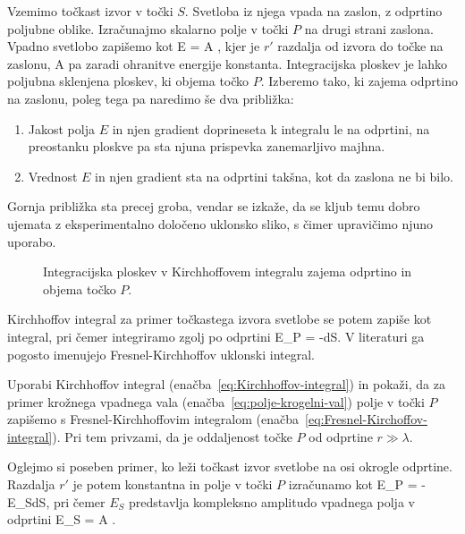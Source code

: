 Vzemimo točkast izvor v točki $S$. Svetloba iz njega vpada na zaslon, 
z odprtino poljubne oblike. Izračunajmo skalarno polje v točki $P$ na drugi 
strani zaslona. Vpadno svetlobo zapišemo kot
\beq
\label{eq:polje-krogelni-val}
E = A ,
\eeq
kjer je $r'$ razdalja od izvora do točke na zaslonu, A pa zaradi ohranitve energije konstanta.
Integracijska ploskev je lahko poljubna sklenjena ploskev, ki objema točko $P$. Izberemo tako, ki
zajema odprtino na zaslonu, poleg tega pa naredimo še dva približka:\\
\begin{enumerate}
\item Jakost polja $E$ in njen gradient doprineseta k integralu le na odprtini, na preostanku ploskve
pa sta njuna prispevka zanemarljivo majhna.\\
\item Vrednost $E$ in njen gradient sta na odprtini takšna, kot da zaslona ne bi bilo.\\
\end{enumerate}
Gornja približka sta precej groba, vendar se izkaže, da se kljub temu
dobro ujemata z eksperimentalno določeno uklonsko sliko, s čimer 
upravičimo njuno uporabo.

\begin{figure}[]
\centering {} 
  
\caption{Integracijska ploskev v Kirchhoffovem integralu zajema odprtino in objema točko $P$.}
\label{fig:UklonFK}
\end{figure}

Kirchhoffov integral za primer točkastega izvora svetlobe se potem zapiše kot integral, pri čemer
integriramo zgolj po odprtini
\beq
E_P = -\int{} dS.
\label{eq:Fresnel-Kirchoffov-integral}
\eeq
V literaturi ga pogosto imenujejo Fresnel-Kirchhoffov uklonski integral.
\begin{definition}
\label{naloga-Fresnel-Kirchhoff-uklon}
Uporabi Kirchhoffov integral (enačba~\ref{eq:Kirchhoffov-integral}) in pokaži, da za primer krožnega vpadnega vala
(enačba~\ref{eq:polje-krogelni-val}) polje v točki $P$ zapišemo s Fresnel-Kirchhoffovim integralom 
(enačba~\ref{eq:Fresnel-Kirchoffov-integral}). Pri tem privzami, da je oddaljenost točke $P$ od odprtine
$r \gg \lambda$.
\end{definition}

Oglejmo si poseben primer, ko leži točkast izvor svetlobe na osi okrogle odprtine. Razdalja
$r'$ je potem konstantna in polje v točki $P$ izračunamo kot 
\beq
\label{eq:Fresnelov-uklon}
E_P =  - \int E_S dS,
\eeq
pri čemer $E_S$ predstavlja kompleksno amplitudo vpadnega polja v odprtini
\beq
E_S = A .
\eeq 

